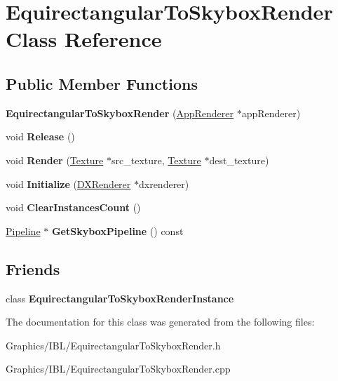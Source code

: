 \hypertarget{classEquirectangularToSkyboxRender}{}\section{Equirectangular\+To\+Skybox\+Render Class Reference}
\label{classEquirectangularToSkyboxRender}
\subsection*{Public Member Functions}
\begin{DoxyCompactItemize}
\item 
\mbox{\label{classEquirectangularToSkyboxRender_a6c9e7e2225d3ac956a870021585f01e6}} 
{\bfseries Equirectangular\+To\+Skybox\+Render} (\hyperlink{classAppRenderer}{App\+Renderer} $\ast$app\+Renderer)
\item 
\mbox{\label{classEquirectangularToSkyboxRender_abb2e9438dff4003bab5a17cdd9163954}} 
void {\bfseries Release} ()
\item 
\mbox{\label{classEquirectangularToSkyboxRender_a4b28e8f1056eb47bd990cc191d4cedac}} 
void {\bfseries Render} (\hyperlink{classTexture}{Texture} $\ast$src\+\_\+texture, \hyperlink{classTexture}{Texture} $\ast$dest\+\_\+texture)
\item 
\mbox{\label{classEquirectangularToSkyboxRender_a0a948dcbd6cce28fc20d60f9e811cc7f}} 
void {\bfseries Initialize} (\hyperlink{classDXRenderer}{D\+X\+Renderer} $\ast$dxrenderer)
\item 
\mbox{\label{classEquirectangularToSkyboxRender_aa44e84a995df6d31b09a6efe6cb9d62b}} 
void {\bfseries Clear\+Instances\+Count} ()
\item 
\mbox{\label{classEquirectangularToSkyboxRender_aeea4858ba8c74f0e2ed11df794ac80ca}} 
\hyperlink{classPipeline}{Pipeline} $\ast$ {\bfseries Get\+Skybox\+Pipeline} () const
\end{DoxyCompactItemize}
\subsection*{Friends}
\begin{DoxyCompactItemize}
\item 
\mbox{\label{classEquirectangularToSkyboxRender_a2ed53da06aa8c96971b58644b85ea2d3}} 
class {\bfseries Equirectangular\+To\+Skybox\+Render\+Instance}
\end{DoxyCompactItemize}


The documentation for this class was generated from the following files\+:\begin{DoxyCompactItemize}
\item 
Graphics/\+I\+B\+L/Equirectangular\+To\+Skybox\+Render.\+h\item 
Graphics/\+I\+B\+L/Equirectangular\+To\+Skybox\+Render.\+cpp\end{DoxyCompactItemize}
